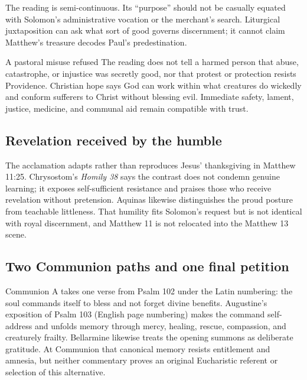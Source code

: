\begin{deepstudy}
The reading is semi-continuous. Its ``purpose'' should not be casually equated with Solomon's administrative vocation or the merchant's search. Liturgical juxtaposition can ask what sort of good governs discernment; it cannot claim Matthew's treasure decodes Paul's predestination.

\begin{studybox}{A pastoral misuse refused}
The reading does not tell a harmed person that abuse, catastrophe, or injustice was secretly good, nor that protest or protection resists Providence. Christian hope says God can work within what creatures do wickedly and conform sufferers to Christ without blessing evil. Immediate safety, lament, justice, medicine, and communal aid remain compatible with trust.
\end{studybox}

\sectionguard
\subsection*{Revelation received by the humble\enspace{}}

The acclamation adapts rather than reproduces Jesus' thanksgiving in Matthew 11:25. Chrysostom's \emph{Homily 38} says the contrast does not condemn genuine learning; it exposes self-sufficient resistance and praises those who receive revelation without pretension. Aquinas likewise distinguishes the proud posture from teachable littleness. That humility fits Solomon's request but is not identical with royal discernment, and Matthew 11 is not relocated into the Matthew 13 scene.

\sectionguard
\subsection*{Two Communion paths and one final petition\enspace{}}

Communion A takes one verse from Psalm 102 under the Latin numbering: the soul commands itself to bless and not forget divine benefits. Augustine's exposition of Psalm 103 (English page numbering) makes the command self-address and unfolds memory through mercy, healing, rescue, compassion, and creaturely frailty. Bellarmine likewise treats the opening summons as deliberate gratitude. At Communion that canonical memory resists entitlement and amnesia, but neither commentary proves an original Eucharistic referent or selection of this alternative.


\end{deepstudy}
